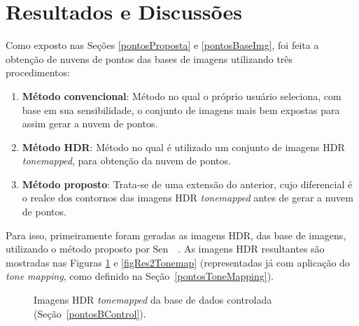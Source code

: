 \section{Resultados e Discussões} \label{pontosResultados}

Como exposto nas Seções \ref{pontosProposta} e \ref{pontosBaseImg}, foi feita a obtenção de nuvens de pontos das bases de imagens utilizando três procedimentos:

\begin{enumerate}
\item \textbf{Método convencional}: Método no qual o próprio usuário seleciona, com base em sua sensibilidade, o conjunto de imagens mais bem expostas para assim gerar a nuvem de pontos.

\item \textbf{Método HDR}: Método no qual é utilizado um conjunto de imagens HDR \textit{tonemapped}, para obtenção da nuvem de pontos.

\item \textbf{Método proposto}: Trata-se de uma extensão do anterior, cujo diferencial é o realce dos contornos das imagens HDR \textit{tonemapped} antes de gerar a nuvem de pontos.
\end{enumerate}

Para isso, primeiramente foram geradas as imagens HDR, das base de imagens, utilizando o método proposto por Sen~\etal~\cite{hdrMovimento}. As imagens HDR resultantes são mostradas nas Figuras \ref{figResTonemap} e \ref{figRes2Tonemap} (representadas já com aplicação do \textit{tone mapping}, como definido na Seção~\ref{pontosToneMapping}). 


\begin{figure}[H]
  \centering 
  \quad %
  \quad %
  \quad %
  \caption{Imagens HDR \textit{tonemapped} da base de dados controlada (Seção~\protect\ref{pontosBControl}).}
  \label{figResTonemap}
\end{figure}

